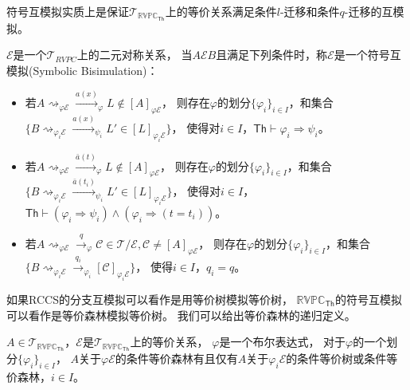 符号互模拟实质上是保证$\mathcal{T}_{\mathbb{RVPC}_{\mathsf{Th}}}$上的等价关系满足条件$l$-迁移和条件$q$-迁移的互模拟。
\begin{definition}[符号互模拟]\label{def:rvpc_symbolic_bisimulation}
   $\mathcal{E}$是一个$\mathcal{T}_{RVPC}$上的二元对称关系，
当$A\mathcal{E}B$且满足下列条件时，称$\mathcal{E}$是一个符号互模拟(Symbolic Bisimulation)：
\begin{itemize}
   \item {
      若$ A \rightsquigarrow_{\varphi \mathcal{E}}\stackrel{a(x)}{\rightarrow}_{\varphi} L\notin [A]_{\varphi \mathcal{E}}$，
      则存在$\varphi$的划分$\{\varphi_i\}_{i\in I}$，和集合$\{B\rightsquigarrow_{\varphi_i \mathcal{E}}\stackrel{a(x)}{\rightarrow}_{\psi_i} L'\in[L]_{\varphi_i\mathcal{E}}\}$，
      使得对$i\in I$，$\mathsf{Th}\vdash \varphi_i \Rightarrow \psi_i$。
   }
   \item {
      若$A \rightsquigarrow_{\varphi \mathcal{E}}\stackrel{\bar{a}(t)}{\rightarrow}_{\varphi} L\notin [A]_{\varphi\mathcal{E}}$，
      则存在$\varphi$的划分$\{\varphi_i\}_{i\in I}$，和集合$\{B\rightsquigarrow_{\varphi_i\mathcal{E}}\stackrel{\bar{a}(t_i)}{\rightarrow}_{\psi_i} L'\in [L]_{\varphi_i\mathcal{E}}\}$，
      使得对$i\in I$，$\mathsf{Th}\vdash (\varphi_i \Rightarrow \psi_i)\wedge (\varphi_i \Rightarrow (t=t_i))$。
   }
   \item {
      若$ A\rightsquigarrow_{\varphi\mathcal{E}} \stackrel{q}{\rightarrow}_{\varphi} \mathcal{C}\in \mathcal{T}/\mathcal{E}, \mathcal{C}\neq [A]_{\varphi \mathcal{E}}$，
      则存在$\varphi$的划分$\{\varphi_i\}_{i\in I}$，和集合$\{B\rightsquigarrow_{\varphi_i\mathcal{E}}\stackrel{q_i}{\rightarrow}_{\varphi_i} [\mathcal{C}]_{\varphi_i\mathcal{E}}\}$，
      使得$i\in I$，$q_i= q$。
   }
\end{itemize}
\end{definition}

如果RCCS的分支互模拟可以看作是用等价树模拟等价树，
$\mathbb{RVPC}_{\mathsf{Th}}$的符号互模拟可以看作是等价森林模拟等价树。
我们可以给出等价森林的递归定义。

\begin{definition}[条件等价森林]
   $A\in\mathcal{T}_{\mathbb{RVPC}_{\mathsf{Th}}}$，$\mathcal{E}$是$\mathcal{T}_{\mathbb{RVPC}_{\mathsf{Th}}}$上的等价关系，
   $\varphi$是一个布尔表达式，
   对于$\varphi$的一个划分$\{\varphi_i\}_{i\in I}$，
   $A$关于$\varphi\mathcal{E}$的条件等价森林有且仅有$A$关于$\varphi_i\mathcal{E}$的条件等价树或条件等价森林，$i\in I$。
\end{definition}

